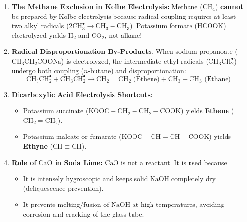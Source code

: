 \documentclass[10pt,twoside,openright]{book}
\begin{document}
\begin{trapbox}
\begin{enumerate}[leftmargin=*]
  \item \textbf{The Methane Exclusion in Kolbe Electrolysis:} Methane ($\mathrm{CH_4}$) \textbf{cannot} be prepared by Kolbe electrolysis because radical coupling requires at least two alkyl radicals ($2\mathrm{CH_3^\bullet} \to \mathrm{CH_3-CH_3}$). Potassium formate ($\mathrm{HCOOK}$) electrolyzed yields $\mathrm{H_2}$ and $\mathrm{CO_2}$, not alkane!
  \item \textbf{Radical Disproportionation By-Products:} When sodium propanoate ($\mathrm{CH_3CH_2COONa}$) is electrolyzed, the intermediate ethyl radicals ($\mathrm{CH_3CH_2^\bullet}$) undergo both coupling ($n$-butane) and disproportionation:
  \begin{equation}
    \mathrm{CH_3CH_2^\bullet} + \mathrm{CH_3CH_2^\bullet} \to \mathrm{CH_2=CH_2} \text{ (Ethene)} + \mathrm{CH_3-CH_3} \text{ (Ethane)}
  \end{equation}
  \item \textbf{Dicarboxylic Acid Electrolysis Shortcuts:}
  \begin{itemize}
    \item Potassium succinate ($\mathrm{KOOC-CH_2-CH_2-COOK}$) yields \textbf{Ethene} ($\mathrm{CH_2=CH_2}$).
    \item Potassium maleate or fumarate ($\mathrm{KOOC-CH=CH-COOK}$) yields \textbf{Ethyne} ($\mathrm{CH\equiv CH}$).
  \end{itemize}
  \item \textbf{Role of $\mathrm{CaO}$ in Soda Lime:} $\mathrm{CaO}$ is not a reactant. It is used because:
  \begin{itemize}
    \item It is intensely hygroscopic and keeps solid $\mathrm{NaOH}$ completely dry (deliquescence prevention).
    \item It prevents melting/fusion of $\mathrm{NaOH}$ at high temperatures, avoiding corrosion and cracking of the glass tube.
  \end{itemize}
\end{enumerate}
\end{trapbox}
\end{document}
